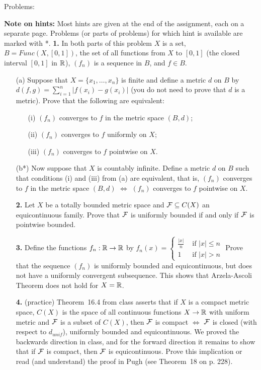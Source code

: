 \documentclass[11pt]{amsart}
\begin{document}
\skv
\bf\centerline{Problems: }\rm
\skv
{\bf Note on hints: } Most hints are given at the end of the assignment, each on a separate page.
Problems (or parts of problems) for which hint is available are marked with *. 
\skv
\skv
{\bf 1.} In both parts of this problem $X$ is a set, $B=Func(X,[0,1])$, the set of all functions from $X$ to $[0,1]$ (the closed interval $[0,1]$ in ${\mathbb R}$),
$(f_n)$ is a sequence in $B$, and $f\in B$. 
\begin{itemize}
\item[(a)] Suppose that $X=\{x_1,\ldots, x_n\}$ is finite and define a metric $d$ on $B$ by 
$d(f,g)=\sum_{i=1}^n |f(x_i)-g(x_i)|$ (you do not need to prove that $d$ is a metric). Prove that the following are equivalent:
\begin{itemize}
\item[(i)] $(f_n)$ converges to $f$ in the metric space $(B,d)$; 
\item[(ii)] $(f_n)$ converges to $f$ uniformly on $X$;
\item[(iii)] $(f_n)$ converges to $f$ pointwise on $X$.
\end{itemize}
\item[(b*)] Now suppose that $X$ is countably infinite. Define a metric $d$ on $B$ such that
conditions (i) and (iii) from (a) are equivalent, that is,
$(f_n)$ converges to $f$ in the metric space $(B,d)$ $\iff$ $(f_n)$ converges to $f$ pointwise on $X$. 
\skv

{\bf 2.} Let $X$ be a totally bounded metric space and ${\mathcal F}\subseteq C(X)$ an equicontinuous family. Prove that
${\mathcal F}$ is uniformly bounded if and only if ${\mathcal F}$ is pointwise bounded. 
\skv

{\bf 3.} Define the functions $f_n:{\mathbb R}\to{\mathbb R}$ by
$f_n(x)=\left\{
\begin{array}{ll}
\frac{|x|}{n} &\mbox{ if } |x|\leq n\\
1 &\mbox{ if } |x|> n
\end{array}
\right.$ 
Prove that the sequence $(f_n)$ is uniformly bounded and equicontinuous,
but does not have a uniformly convergent subsequence. This shows that
Arzela-Ascoli Theorem does not hold for $X={\mathbb R}$.
\skv

{\bf 4.} (practice) Theorem~16.4 from class asserts that if $X$ is a compact metric space, $C(X)$ is the space
of all continuous functions $X\to{\mathbb R}$ with uniform metric and ${\mathcal F}$ is a subset of $C(X)$, then ${\mathcal F}$ is compact
$\iff$ ${\mathcal F}$ is closed (with respect to $d_{unif}$), uniformly bounded and equicontinuous. We proved the backwards direction
in class, and for the forward direction it remains to show that if ${\mathcal F}$ is compact, then ${\mathcal F}$ is equicontinuous. Prove
this implication or read (and understand) the proof in Pugh (see Theorem~18 on p. 228).  


\end{itemize}
\end{document}
